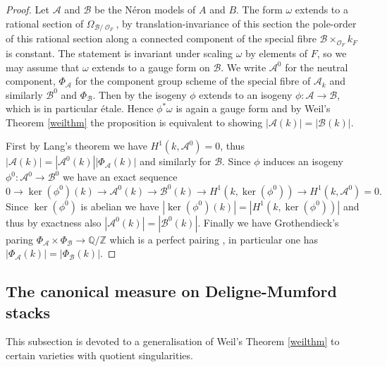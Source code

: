 \documentclass{article}
\DeclareMathOperator{\Gal}{Gal}
\DeclareMathOperator{\Oo}{\mathcal{O}}
\newcommand{\BQ}{{\mathbb{Q}}}
\newcommand{\BZ}{{\mathbb{Z}}}
\newcommand{\CB}{{\mathcal B}}
\theoremstyle{definition}
\theoremstyle{plain}
\begin{document}
\begin{proof} Let $\mathcal{A}$ and $\mathcal{B}$ be the N\'eron models of $A$ and $B$. The form $\omega$ extends to a rational section of $\Omega_{\CB/\Oo_F}$, by translation-invariance of this section the pole-order of this rational section along a connected component of the special fibre $\CB \times_{\Oo_F} k_F$ is constant. The statement is invariant under scaling $\omega$ by elements of $F$, so we may assume that $\omega$ extends to a gauge form on $\CB$. We write $\mathcal{A}^0$ for the neutral component, $\Phi_{\mathcal{A}}$ for the component group scheme of the special fibre of $\mathcal{A}_{k}$ and similarly $\CB^0$ and $\Phi_\CB$. Then by \cite[7.3.6]{NeronModels} the isogeny $\phi$ extends to an isogeny $\phi:\mathcal{A} \to \CB$, which is in particular \'etale. Hence $\phi^* \omega$ is again a gauge form and by Weil's Theorem \ref{weilthm} the proposition is equivalent to showing $|\mathcal{A}(k)| = | \CB(k)|$.

First by Lang's theorem we have $H^1(k,  \mathcal{A}^0)=0$, thus $|\mathcal{A}(k)| = |\mathcal{A}^0(k)||\Phi_{\mathcal{A}}(k)|$ and similarly for $\CB$. Since $\phi$ induces an isogeny $\phi^0:\mathcal{A}^0 \to \CB^0$ we have an exact sequence 
\[ 0 \rightarrow \ker(\phi^0)(k) \rightarrow  \mathcal{A}^0(k) \rightarrow   \mathcal{B}^0(k) \rightarrow H^1(k,\ker(\phi^0)) \rightarrow H^1(k,  \mathcal{A}^0) = 0.  \]
Since $\ker(\phi^0)$ is abelian we have $| \ker(\phi^0)(k)| = |H^1(k,\ker(\phi^0))|$ and thus by exactness also $|\mathcal{A}^0(k)| = |\CB^0(k)|$. Finally we have Grothendieck's paring $\Phi_{\mathcal{A}} \times \Phi_{\CB} \to \BQ/\BZ$ which is a perfect pairing 
\cite{Mc86}, in particular one has $|\Phi_{\mathcal{A}}(k)|=|\Phi_{\CB}(k)|$.

\end{proof} 


\subsection{The canonical measure on Deligne-Mumford stacks} \label{canmedm}

This subsection is devoted to a generalisation of Weil's Theorem \ref{weilthm} to certain varieties with quotient singularities.
\end{document}
